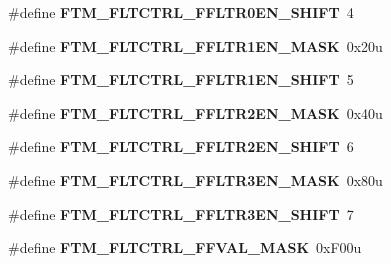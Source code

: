 \begin{DoxyCompactItemize}
\item 
\#define {\bfseries F\+T\+M\+\_\+\+F\+L\+T\+C\+T\+R\+L\+\_\+\+F\+F\+L\+T\+R0\+E\+N\+\_\+\+S\+H\+I\+FT}~4\hypertarget{group__FTM__Register__Masks_gae70106a7899ed40bc3d6252a1826e0eb}{}\label{group__FTM__Register__Masks_gae70106a7899ed40bc3d6252a1826e0eb}

\item 
\#define {\bfseries F\+T\+M\+\_\+\+F\+L\+T\+C\+T\+R\+L\+\_\+\+F\+F\+L\+T\+R1\+E\+N\+\_\+\+M\+A\+SK}~0x20u\hypertarget{group__FTM__Register__Masks_ga0f14665d0a31ab1137dc4988671225a2}{}\label{group__FTM__Register__Masks_ga0f14665d0a31ab1137dc4988671225a2}

\item 
\#define {\bfseries F\+T\+M\+\_\+\+F\+L\+T\+C\+T\+R\+L\+\_\+\+F\+F\+L\+T\+R1\+E\+N\+\_\+\+S\+H\+I\+FT}~5\hypertarget{group__FTM__Register__Masks_gaa027617739dc7dbcc2f709d42941257e}{}\label{group__FTM__Register__Masks_gaa027617739dc7dbcc2f709d42941257e}

\item 
\#define {\bfseries F\+T\+M\+\_\+\+F\+L\+T\+C\+T\+R\+L\+\_\+\+F\+F\+L\+T\+R2\+E\+N\+\_\+\+M\+A\+SK}~0x40u\hypertarget{group__FTM__Register__Masks_gaf2c71dfc0e67908acb3818cdb38f7097}{}\label{group__FTM__Register__Masks_gaf2c71dfc0e67908acb3818cdb38f7097}

\item 
\#define {\bfseries F\+T\+M\+\_\+\+F\+L\+T\+C\+T\+R\+L\+\_\+\+F\+F\+L\+T\+R2\+E\+N\+\_\+\+S\+H\+I\+FT}~6\hypertarget{group__FTM__Register__Masks_ga74a686a0b3a50cc05515e7948446722e}{}\label{group__FTM__Register__Masks_ga74a686a0b3a50cc05515e7948446722e}

\item 
\#define {\bfseries F\+T\+M\+\_\+\+F\+L\+T\+C\+T\+R\+L\+\_\+\+F\+F\+L\+T\+R3\+E\+N\+\_\+\+M\+A\+SK}~0x80u\hypertarget{group__FTM__Register__Masks_gae2c942a53916267eea52d5eaa1fd9db0}{}\label{group__FTM__Register__Masks_gae2c942a53916267eea52d5eaa1fd9db0}

\item 
\#define {\bfseries F\+T\+M\+\_\+\+F\+L\+T\+C\+T\+R\+L\+\_\+\+F\+F\+L\+T\+R3\+E\+N\+\_\+\+S\+H\+I\+FT}~7\hypertarget{group__FTM__Register__Masks_ga03854a8ffab858afd4a9594b185faead}{}\label{group__FTM__Register__Masks_ga03854a8ffab858afd4a9594b185faead}

\item 
\#define {\bfseries F\+T\+M\+\_\+\+F\+L\+T\+C\+T\+R\+L\+\_\+\+F\+F\+V\+A\+L\+\_\+\+M\+A\+SK}~0x\+F00u\hypertarget{group__FTM__Register__Masks_gaca5b1d8eaedb1a55c4cc3be2d17ac80d}{}\label{group__FTM__Register__Masks_gaca5b1d8eaedb1a55c4cc3be2d17ac80d}


\end{DoxyCompactItemize}
